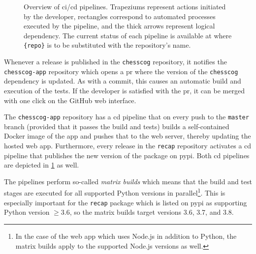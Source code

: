 \documentclass[../report.tex]{subfiles}
\begin{document}
\begin{figure}
{
    }
    \caption[Overview of \acs{ci}/\acs{cd} pipelines.]{Overview of \acs{ci}/\acs{cd} pipelines. Trapeziums represent actions initiated by the developer, rectangles correspond to automated processes executed by the pipeline, and the thick arrows represent logical dependency. The current status of each pipeline is available at  where \texttt{\{repo\}} is to be substituted with the repository’s name.}
    \label{fig:cicd}
\end{figure}
Whenever a release is published in the \texttt{chesscog} repository, it notifies the \texttt{chesscog-app} repository which opens a \gls{pr} where the version of the \texttt{chesscog} dependency is updated.
As with a commit, this causes an automatic build and execution of the tests.
If the developer is satisfied with the \gls{pr}, it can be merged with one click on the GitHub web interface.

The \texttt{chesscog-app} repository has a \gls{cd} pipeline that on every push to the \texttt{master} branch (provided that it passes the build and tests) builds a self-contained Docker image of the app and pushes that to the web server, thereby updating the hosted web app.
Furthermore, every release in the \texttt{recap} repository activates a \gls{cd} pipeline that publishes the new version of the package on \gls{pypi}.
Both \gls{cd} pipelines are depicted in \cref{fig:cicd} as well.

The pipelines perform so-called \emph{matrix builds} which means that the build and test stages are executed for all supported Python versions in parallel\footnote{In the case of the web app which uses Node.js in addition to Python, the matrix builds apply to the supported Node.js versions as well.}.
This is especially important for the \texttt{recap} package which is listed on \gls{pypi} as supporting Python version $\geq 3.6$, so the matrix builds target versions 3.6, 3.7, and 3.8.
\end{document}
